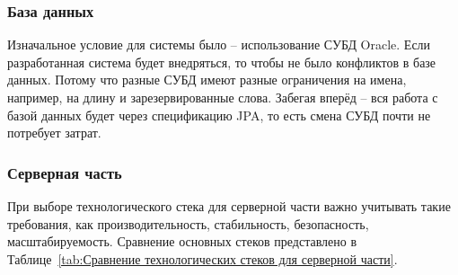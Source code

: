 \documentclass[a4paper,article]{article}
\begin{document}
    \subsubsection{База данных}\label{Реализация. Выбор. База данных}

    Изначальное условие для системы было -- использование СУБД Oracle. Если разработанная система будет внедряться, то чтобы не было конфликтов в базе данных. Потому что разные СУБД имеют разные ограничения на имена, например, на длину и зарезервированные слова. Забегая вперёд -- вся работа с базой данных будет через спецификацию JPA, то есть смена СУБД почти не потребует затрат.

    \newpage

    \subsubsection{Серверная часть}\label{Реализация. Выбор. Серверная часть}

    При выборе технологического стека для серверной части важно учитывать такие требования, как производительность, стабильность, безопасность, масштабируемость. Сравнение основных стеков представлено в Таблице~\ref{tab:Сравнение технологических стеков для серверной части}.
\end{document}
